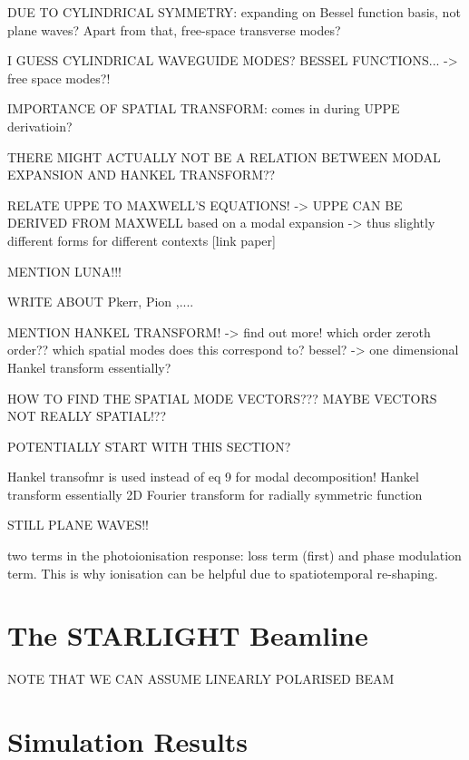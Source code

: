 \documentclass[a4paper]{jpconf}
\begin{document}
DUE TO CYLINDRICAL SYMMETRY: expanding on Bessel function basis, not plane waves? Apart from that, free-space transverse modes?

I GUESS CYLINDRICAL WAVEGUIDE MODES? BESSEL FUNCTIONS...
		-> free space modes?!
		
		IMPORTANCE OF SPATIAL TRANSFORM: comes in during UPPE derivatioin?

THERE MIGHT ACTUALLY NOT BE A RELATION BETWEEN MODAL EXPANSION AND HANKEL TRANSFORM??


RELATE UPPE TO MAXWELL'S EQUATIONS!
		-> UPPE CAN BE DERIVED FROM MAXWELL based on a modal expansion  -> thus slightly different forms for different contexts [link paper]

MENTION LUNA!!!

WRITE ABOUT Pkerr, Pion ,....

MENTION HANKEL TRANSFORM! -> find out more! which order zeroth order?? which spatial modes does this correspond to? bessel? -> one dimensional Hankel transform essentially?

HOW TO FIND THE SPATIAL MODE VECTORS???
	MAYBE VECTORS NOT REALLY SPATIAL!??

POTENTIALLY START WITH THIS SECTION?

Hankel transofmr is used instead of eq 9 for modal decomposition! Hankel transform essentially 2D Fourier transform for radially symmetric function

STILL PLANE WAVES!!


two terms in the photoionisation response: loss term (first) and phase modulation term. This is why ionisation can be helpful due to spatiotemporal re-shaping.

\section{The STARLIGHT Beamline}

NOTE THAT WE CAN ASSUME LINEARLY POLARISED BEAM

\section{Simulation Results}
\end{document}
